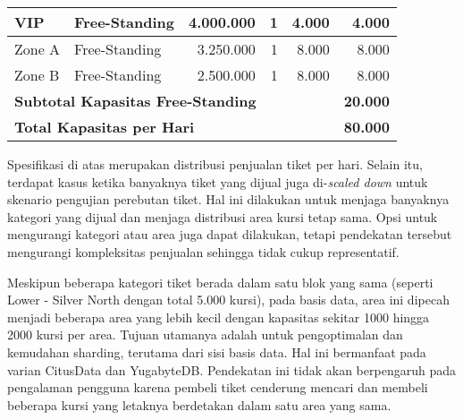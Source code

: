 \begin{longtable}{|l|l|r|r|r|r|}
    VIP                                                             & Free-Standing   & 4.000.000           & 1             & 4.000               & 4.000          \\
    \hline
    Zone A                                                          & Free-Standing   & 3.250.000           & 1             & 8.000               & 8.000          \\
    \hline
    Zone B                                                          & Free-Standing   & 2.500.000           & 1             & 8.000               & 8.000          \\
    \hline
    \multicolumn{5}{|l|}{\textbf{Subtotal Kapasitas Free-Standing}} & \textbf{20.000}                                                                              \\
    \hline \hline

    \multicolumn{5}{|l|}{\textbf{Total Kapasitas per Hari}}         & \textbf{80.000}                                                                              \\
\end{longtable}
\endgroup

Spesifikasi di atas merupakan distribusi penjualan tiket per hari. Selain itu, terdapat kasus ketika banyaknya tiket yang dijual juga di-\textit{scaled down} untuk skenario pengujian perebutan tiket. Hal ini dilakukan untuk menjaga banyaknya kategori yang dijual dan menjaga distribusi area kursi tetap sama. Opsi untuk mengurangi kategori atau area juga dapat dilakukan, tetapi pendekatan tersebut mengurangi kompleksitas penjualan sehingga tidak cukup representatif.

Meskipun beberapa kategori tiket berada dalam satu blok yang sama (seperti Lower - Silver North dengan total 5.000 kursi), pada basis data, area ini dipecah menjadi beberapa area yang lebih kecil dengan kapasitas sekitar 1000 hingga 2000 kursi per area. Tujuan utamanya adalah untuk pengoptimalan dan kemudahan sharding, terutama dari sisi basis data. Hal ini bermanfaat pada varian CitusData dan YugabyteDB. Pendekatan ini tidak akan berpengaruh pada pengalaman pengguna karena pembeli tiket cenderung mencari dan membeli beberapa kursi yang letaknya berdetakan dalam satu area yang sama.